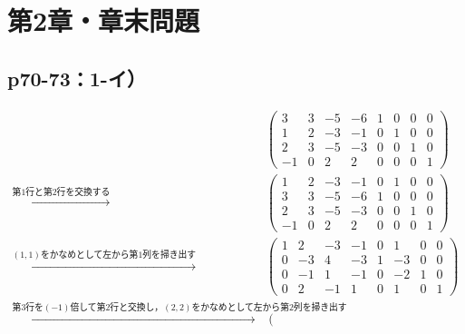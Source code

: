 \documentclass[uplatex,dvipdfmx,a4paper,10pt,fleqn]{jsarticle}
\begin{document}
\section*{第2章・章末問題}


\subsection*{p70-73：1-イ）}

\begin{leftbar}
        \begin{align*} 
        &
        \left( 
            \begin{array}{cccc|cccc}
            3 & 3 & -5 & -6 & 1 & 0 & 0 & 0\\ 
            1 & 2 & -3 & -1 & 0 & 1 & 0 & 0 \\ 
            2 & 3 & -5 & -3 & 0 & 0 & 1 & 0 \\
            -1 & 0 & 2 & 2 & 0 & 0 & 0 & 1 
            \end{array}
            \right) \\
           \xrightarrow{\text{第$1$行と第$2$行を交換する}} &
            \left( \begin{array}{cccc|cccc}
                1 & 2 & -3 & -1 & 0 & 1 & 0 & 0 \\ 
                3 & 3 & -5 & -6 & 1 & 0 & 0 & 0\\ 
                2 & 3 & -5 & -3 & 0 & 0 & 1 & 0 \\
                -1 & 0 & 2 & 2 & 0 & 0 & 0 & 1 
                \end{array}
                \right)\\
           \xrightarrow{\text{$(1,1)$をかなめとして左から第1列を掃き出す}} &
           \left( \begin{array}{cccc|cccc}
            1 & 2 & -3 & -1 & 0 & 1 & 0 & 0 \\ 
            0 & -3 & 4 & -3 & 1 & -3 & 0 & 0\\ 
            0 & -1 & 1 & -1 & 0 & -2 & 1 & 0 \\
            0 & 2 & -1 & 1 & 0 & 1 & 0 & 1 
            \end{array}
            \right)\\
            \xrightarrow{\text{第$3$行を$(-1)$倍して第2行と交換し，$(2,2)$をかなめとして左から第$2$列を掃き出す}} &
           \left( \begin{array}{cccc|cccc}

\end{array}
\end{align*}
\end{leftbar}
\end{document}
